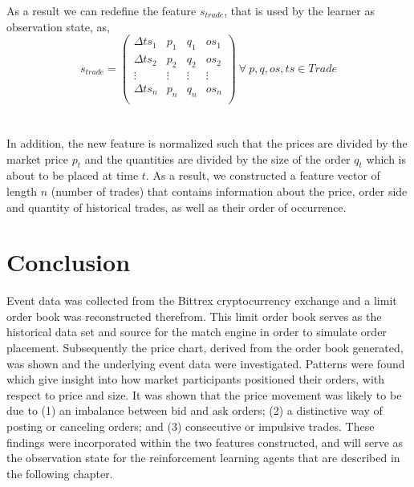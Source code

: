 As a result we can redefine the feature $s_{trade}$, that is used by the learner as observation state, as,
\begin{equation}
    s_{trade} =\begin{pmatrix}
        \Delta{ts_1} & p_1 & q_1 & os_1 \\
        \Delta{ts_2} & p_2 & q_2 & os_2 \\
        \vdots & \vdots & \vdots & \vdots\\
        \Delta{ts_n} & p_n & q_n & os_n \\
    \end{pmatrix}
    \ \forall \ p, q, os, ts \in Trade
\end{equation}
\hfill
\\
\\
In addition, the new feature is normalized such that the prices are divided by the market price $p_t$ and the quantities are divided by the size of the order $q_t$ which is about to be placed at time $t$.
As a result, we constructed a feature vector of length $n$ (number of trades) that contains information about the price, order side and quantity of historical trades, as well as their order of occurrence.

\section{Conclusion}

Event data was collected from the Bittrex cryptocurrency exchange and a limit order book was reconstructed therefrom.
This limit order book serves as the historical data set and source for the match engine in order to simulate order placement. 
Subsequently the price chart, derived from the order book generated, was shown and the underlying event data were investigated.
Patterns were found which give insight into how market participants positioned their orders, with respect to price and size.
It was shown that the price movement was likely to be due to (1) an imbalance between bid and ask orders; (2) a distinctive way of posting or canceling orders; and (3) consecutive or impulsive trades.
These findings were incorporated within the two features constructed, and will serve as the observation state for the reinforcement learning agents that are described in the following chapter.